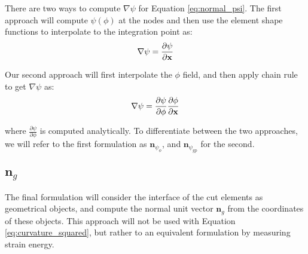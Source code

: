 There are two ways to compute $\nabla \psi$ for Equation \ref{eq:normal_psi}. The first approach will compute $\psi\left(\phi\right)$ at the nodes and then use the element shape functions to interpolate to the integration point as:
%
\begin{equation}
	\centering
	\label{eq:nabla_psi_nodal}
	\nabla \psi = \frac{\partial \psi}{\partial \mathbf{x}}
\end{equation} 

Our second approach will first interpolate the $\phi$ field, and then apply chain rule to get $\nabla \psi$ as:
%
\begin{equation}
	\centering
	\label{eq:nabla_psi_gauss}
	\nabla \psi = \frac{\partial \psi}{\partial \phi} \frac{\partial \phi}{\partial \mathbf{x}}
\end{equation} 

where $\frac{\partial \psi}{\partial \phi}$ is computed analytically. To differentiate between the two approaches, we will refer to the first formulation as $\mathbf{n}_{\psi_{\phi}}$, and $\mathbf{n}_{\psi_{\mathrm{gp}}}$ for the second.


\subsection{$\mathbf{n}_{g}$}
\label{sec:ngeo}

The final formulation will consider the interface of the cut elements as geometrical objects, and compute the normal unit vector $\mathbf{n}_{g}$ from the coordinates of these objects. This approach will not be used with Equation \ref{eq:curvature_squared}, but rather to an equivalent formulation by measuring strain energy.

